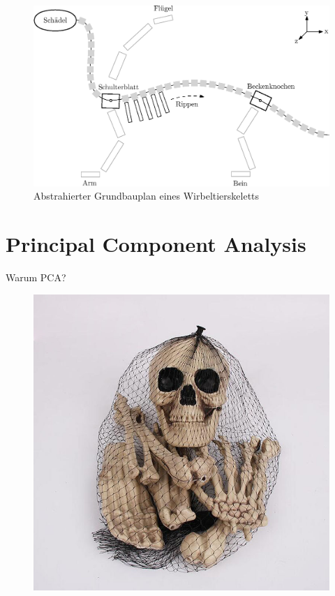\documentclass{beamer}
\begin{document}
\begin{frame}[plain]
 \begin{figure}
  \centering
  \includegraphics[width=\textwidth]{../graphics/skeletonPlan}
  \caption{Abstrahierter Grundbauplan eines Wirbeltierskeletts}
 \end{figure}
\end{frame}

\section{Principal Component Analysis}
\begin{frame}{Warum PCA?}
 \begin{figure}
  \centering
  \includegraphics[height=0.7\textheight]{graphics/skeleton_set.jpg}
  \caption{\cite{skeleton_set}}
 \end{figure}
\end{frame}
\end{document}
